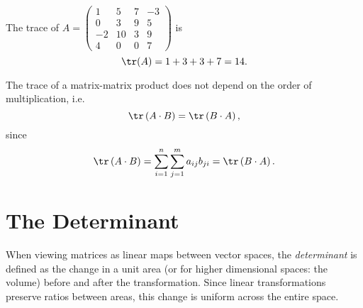 \begin{example}
  The trace of $A=\begin{pmatrix} 1 & 5 & 7 & -3 \\ 0 & 3 & 9 & 5 \\ -2 & 10 & 3 & 9 \\ 4 & 0 & 0 & 7 \end{pmatrix}$ is
  \begin{equation*}
	\tr(A) = 1 + 3 + 3 + 7 = 14.
  \end{equation*}
\end{example}

The trace of a matrix-matrix product does not depend on the order of multiplication, i.e.
\begin{equation*}
  \tr\left( A\cdot B \right) = \tr\left( B\cdot A \right),
\end{equation*}
since
\begin{equation*}
  \tr\left( A\cdot B \right) = \sum\limits_{i=1}^{n}\sum\limits_{j=1}^{m}a_{ij}b_{ji} = \tr\left( B\cdot A \right).
\end{equation*}

\section{The Determinant}
When viewing matrices as linear maps between vector spaces, the \emph{determinant} is defined as the change in a unit area (or for higher dimensional spaces: the volume) before and after the transformation. Since linear transformations preserve ratios between areas, this change is uniform across the entire space.

